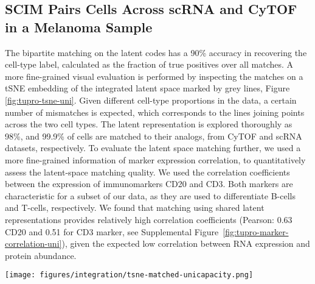 \subsection{SCIM Pairs Cells Across scRNA and CyTOF in a Melanoma Sample}
The bipartite matching on the latent codes has a 90\% accuracy in recovering the cell-type label, calculated as the fraction of true positives over all matches.
A more fine-grained visual evaluation is performed by inspecting the matches on a tSNE embedding of the integrated latent space marked by grey lines, Figure \ref{fig:tupro-tsne-uni}.
Given different cell-type proportions in the data, a certain number of mismatches is expected, which corresponds to the lines joining points across the two cell types.
The latent representation is explored thoroughly as 98\%, and 99.9\% of cells are matched to their analogs, from CyTOF and scRNA datasets, respectively.
To evaluate the latent space matching further, we used a more fine-grained information of marker expression correlation, to quantitatively assess the latent-space matching quality.
We used the correlation coefficients between the expression of immunomarkers \textsc{CD20} and \textsc{CD3}.
Both markers are characteristic for a subset of our data, as they are used to differentiate B-cells and T-cells, respectively.
We found that matching using shared latent representations provides relatively high correlation coefficients
(Pearson: 0.63 \textsc{CD20} and 0.51 for \textsc{CD3} marker, see Supplemental Figure~\ref{fig:tupro-marker-correlation-uni}),
given the expected low correlation between RNA expression and protein abundance.

\begin{figure*}[htbp]
    \centering
    \texttt{[image: figures/integration/tsne-matched-unicapacity.png]}
    \caption{
    Integrated latent space and matches of scRNA and CyTOF cells from a melanoma sample from the Tumor Profiler Consortium.
    Discriminators are semi-supervised using 10\% of the cell-type labels.
    Cells are colored by their cell-type label and shaded by their technology (dark shades: CyTOF, light shades: scRNA).
    Matches produced by SCIM are represented by grey lines connecting cells.
    tSNE embeddings \cite{maaten2008} are computed on the whole dataset and then 10,000 matched pairs are sampled at random for visualization.}
    \label{fig:tupro-tsne-uni}
\end{figure*}


